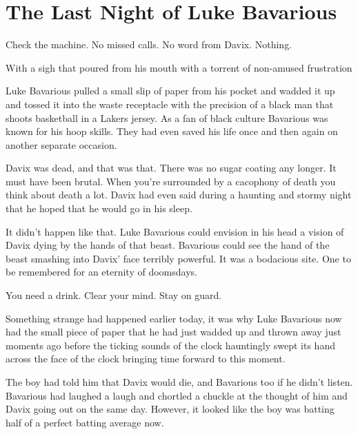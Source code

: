 \chapter{The Last Night of Luke Bavarious}







Check the machine. No missed calls. No word from Davix.
Nothing.



With a sigh that poured from his mouth with a torrent of non-amused
frustration

Luke Bavarious pulled a small slip of paper from his pock\-et and
wadded it up and tossed it into the waste receptacle with the
precision of a black man that shoots basketball in a Lakers jersey.
As a fan of black culture Bavarious was known for his hoop skills.
They had even saved his life once and then again on another
separate occasion.



Davix was dead, and that was that. There was no sugar coating any
longer. It must have been brutal. When you're surrounded by a
cacophony of death you think about death a lot. Davix had even said
during a haunting and stormy night that he hoped that he would go
in his sleep.



It didn't happen like that. Luke Bavarious could envision in
his head a vision of Davix dying by the hands of that beast.
Bavarious could see the hand of the beast smashing into
Davix' face terribly powerful. It was a bodacious site. One
to be remembered for an eternity of doomsdays.



You need a drink. Clear your mind. Stay on guard.



Something strange had happened earlier today, it was why Luke
Bavarious now had the small piece of paper that he had just wadded
up and thrown away just moments ago before the ticking sounds of
the clock hauntingly swept its hand across the face of the clock
bringing time forward to this moment.



The boy had told him that Davix would die, and Bavarious too if he
didn't listen. Bavarious had laughed a laugh and chortled a
chuckle at the thought of him and Davix going out on the same day.
However, it looked like the boy was batting half of a perfect
batting average now.



